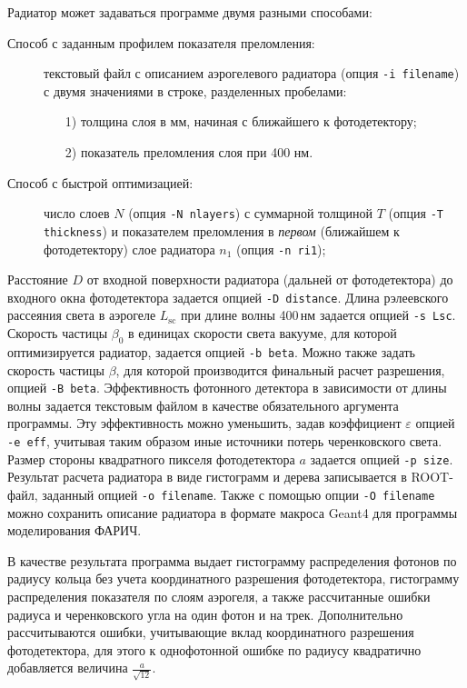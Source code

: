 \documentclass[12pt]{article}
\newcommand{\lsc}{\ensuremath{L_\mathrm{sc}}\xspace}
\newcommand{\betaop}{\ensuremath{\beta_\mathrm{0}}\xspace}
\begin{document}
Радиатор может задаваться программе двумя разными способами:
\begin{description}
 \item[Способ с заданным профилем показателя преломления:] текстовый файл с описанием аэрогелевого радиатора 
      (опция {\tt -i filename}) с двумя значениями в строке, разделенных пробелами: 
      \begin{enumerate}
        \item[1)] толщина слоя в мм, начиная с ближайшего к фотодетектору;
        \item[2)] показатель преломления слоя при 400 нм.
      \end{enumerate}
 \item[Способ с быстрой оптимизацией:] число слоев $N$ (опция {\tt -N nlayers}) с суммарной толщиной $T$ (опция {\tt -T thickness}) и показателем преломления 
      в {\em первом} (ближайшем к фотодетектору) слое радиатора $n_1$ (опция {\tt -n ri1});
\end{description}
Расстояние $D$ от входной поверхности радиатора (дальней от фотодетектора) до входного окна фотодетектора задается опцией {\tt -D distance}.
Длина рэлеевского рассеяния света в аэрогеле \lsc при длине волны 400\,нм задается опцией {\tt -s Lsc}. 
Скорость частицы \betaop в единицах скорости света вакууме, для которой оптимизируется радиатор, задается опцией {\tt -b beta}. 
Можно также задать скорость частицы $\beta$, для которой производится финальный расчет разрешения, опцией {\tt -B beta}.
Эффективность фотонного детектора в зависимости от длины волны задается текстовым файлом в качестве обязательного аргумента программы. 
Эту эффективность можно уменьшить, задав коэффициент $\varepsilon$ опцией {\tt -e eff}, учитывая таким образом иные источники потерь черенковского света. 
Размер стороны квадратного пикселя фотодетектора $a$ задается опцией {\tt -p size}. Результат расчета радиатора в виде гистограмм и дерева записывается 
в ROOT-файл, заданный опцией {\tt -o filename}. Также с помощью опции {\tt -O filename} можно сохранить описание радиатора в формате макроса Geant4 
для программы моделирования ФАРИЧ.

В качестве результата программа выдает гистограмму распределения фотонов по радиусу кольца без учета координатного разрешения фотодетектора, гистограмму
распределения показателя по слоям аэрогеля, а также рассчитанные ошибки радиуса и черенковского угла на один фотон и на трек. 
Дополнительно рассчитываются ошибки, учитывающие вклад координатного разрешения 
фотодетектора, для этого к однофотонной ошибке по радиусу квадратично добавляется величина $\frac{a}{\sqrt{12}}$.
\end{document}
